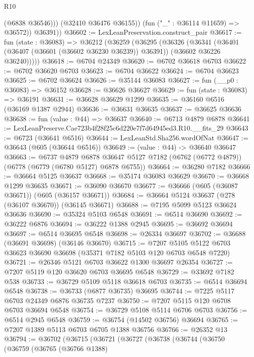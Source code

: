 \begin{lexlean}{R10}
\begin{coremodule}
                (@6838 @36546)))
            (@32410 @36476 @36155))
          (fun ("_" : @36114 @11659) => @36572))
        @36391))
@36602 := LexLeanPreservation.construct_pair
@36617 := fun (state : @36083) =>
  @36212
    (@36259
      (@36295
        (@36326
          (@36341
            (@36401 (@36407 (@36601 (@36602 @36230 @36239)) @36391))
            (@36602 @36226 @36240)))))
@36618 := @6704 @24349
@36620 := @6702 @36618 @6703
@36622 := @6702 @36620 @6703
@36623 := @6704 @36622
@36624 := @6704 @36623
@36625 := @6702 @36624
@36626 := @35144 @36083
@36627 := fun (__p0 : @36083) => @36152
@36628 := @36626 @36627
@36629 := fun (state : @36083) => @36191
@36631 := @36628 @36629 @1299
@36635 := @36160 @6516 (@36169 @1387 @2944)
@36636 := @36631 @36635
@36637 := @36625 @36636
@36638 := fun (value : @44) => @36637
@36640 := @6713 @4879 @6878
@36641 := LexLeanPreserve.Cae723b4f28f25c6d220e7f7d64945ed3.R10.__fits_29
@36643 := @6723 (@36641 @6516)
@36644 := LexLeanStd.Sha256.wordOfNat
@36647 := @36643 (@605 (@36644 @6516))
@36649 := (value : @44) -> @36640 @36647
@36663 := @6737
    @4879
    @6878
    @36647
    @5127
    @7182
    (@6762 (@6772 @4879))
    (@6778 (@6779 (@6780 @5127) @6878 @6755))
@36664 := @36280 @7182
@36666 := @36664 @5125 @36637
@36668 := @35174 @36083 @36629
@36670 := @36668 @1299 @36635
@36671 := @36090 @36670
@36677 := @36666 (@605 (@36087 @36671)) (@605 (@36157 @36671))
@36684 := @36664 @5124 @36637 (@278 (@36107 @36670)) (@36145 @36671)
@36688 := @7195 @5099 @5123 @36624 @36636
@36690 := @35324 @5103 @6548
@36691 := @6514 @36690
@36692 := @36222 @6876
@36694 := @36222 @1388 @2945
@36695 := @36692 @36694
@36697 := @6514 @36695 @6548
@36698 := @26334 @36697
@36702 := @36688 (@36691 @36698) (@36146 @36670)
@36715 := @7207 @5105 @5122 @6703 @36623 @36690 @36698 (@35371 @7182 @5103 @120 @6703 @6548 @7220)
@36721 := @26346 @5121 @6703 @36622 @1300 @36697 @26354
@36727 := @7207 @5119 @120 @36620 @6703 @36695 @6548
@36729 := @33692 @7182 @538
@36733 := @36729 @5109 @5118 @36618 @6703
@36735 := @6514 @36694 @6548
@36738 := @36733 (@6877 @36735) @36695
@36744 := @7225 @5117 @6703 @24349 @6876 @36735 @7237
@36750 := @7207 @5115 @120 @6708 @6703 @36694 @6548
@36754 := @36729 @5108 @5114 @6706 @6703
@36756 := @6514 @2945 @6548
@36759 := @36754 (@14502 @36756) @36694
@36765 := @7207 @1389 @5113 @6703 @6705 @1388 @36756
@36766 := @26352 @13
@36794 := @36702
    (@36715
      (@36721
        (@36727
          (@36738
            (@36744
              (@36750
                (@36759
                  (@36765
                    (@36766 @1388)

\end{coremodule}
\end{lexlean}
